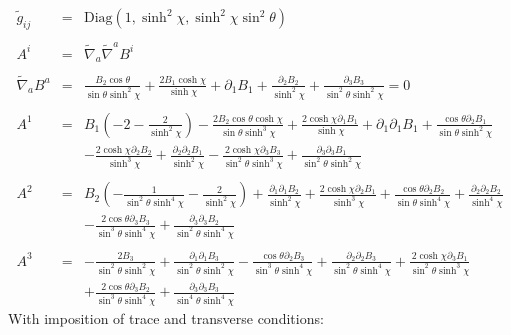 \documentclass[10pt,letterpaper]{article}
\numberwithin{equation}{section}
\begin{document}
\begin{eqnarray}
\tilde g_{ij} &=&\text{Diag}\left(1,\sinh^2\chi,\sinh^2\chi\sin^2\theta\right)
\\ \nonumber\\
A^i &=& \tilde\nabla_a\tilde\nabla^a B^i
\\ \nonumber\\
\tilde\nabla_a B^a&=& \frac{B_{2} \cos\theta}{\sin\theta \sinh^2\chi} + \frac{2 B_{1} \cosh\chi}{\sinh\chi} + \partial_{1}B_{1} + \frac{\partial_{2}B_{2}}{\sinh^2\chi} + \frac{\partial_{3}B_{3}}{\sin^2\theta \sinh^2\chi}=0
\\ \nonumber\\
A^1&=& B_{1} \left(-2 -  \frac{2}{\sinh^2\chi}\right) -  \frac{2 B_{2} \cos\theta \cosh\chi}{\sin\theta \sinh^3\chi} + \frac{2 \cosh\chi \partial_{1}B_{1}}{\sinh\chi} + \partial_{1}\partial_{1}B_{1} + \frac{\cos\theta \partial_{2}B_{1}}{\sin\theta \sinh^2\chi} \nonumber \\ 
&& -  \frac{2 \cosh\chi \partial_{2}B_{2}}{\sinh^3\chi} + \frac{\partial_{2}\partial_{2}B_{1}}{\sinh^2\chi} -  \frac{2 \cosh\chi \partial_{3}B_{3}}{\sin^2\theta \sinh^3\chi} + \frac{\partial_{3}\partial_{3}B_{1}}{\sin^2\theta \sinh^2\chi}
\\ \nonumber\\
A^2&=& B_{2} \left(- \frac{1}{\sin^2\theta \sinh^4\chi} -  \frac{2}{\sinh^2\chi}\right) + \frac{\partial_{1}\partial_{1}B_{2}}{\sinh^2\chi} + \frac{2 \cosh\chi \partial_{2}B_{1}}{\sinh^3\chi} + \frac{\cos\theta \partial_{2}B_{2}}{\sin\theta \sinh^4\chi} + \frac{\partial_{2}\partial_{2}B_{2}}{\sinh^4\chi} \nonumber \\ 
&& -  \frac{2 \cos\theta \partial_{3}B_{3}}{\sin^3\theta \sinh^4\chi} + \frac{\partial_{3}\partial_{3}B_{2}}{\sin^2\theta \sinh^4\chi}
\\ \nonumber\\
A^3&=& - \frac{2 B_{3}}{\sin^2\theta \sinh^2\chi} + \frac{\partial_{1}\partial_{1}B_{3}}{\sin^2\theta \sinh^2\chi} -  \frac{\cos\theta \partial_{2}B_{3}}{\sin^3\theta \sinh^4\chi} + \frac{\partial_{2}\partial_{2}B_{3}}{\sin^2\theta \sinh^4\chi} + \frac{2 \cosh\chi \partial_{3}B_{1}}{\sin^2\theta \sinh^3\chi} \nonumber \\ 
&& + \frac{2 \cos\theta \partial_{3}B_{2}}{\sin^3\theta \sinh^4\chi} + \frac{\partial_{3}\partial_{3}B_{3}}{\sin^4\theta \sinh^4\chi}
\end{eqnarray}
With imposition of trace and transverse conditions:
\end{document}
